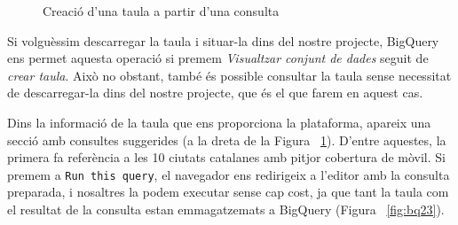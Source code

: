 \documentclass[12pt,longbibliography]{article}
\theoremstyle{definition}
\theoremstyle{remark}
\begin{document}
\vspace{2mm}
\begin{figure}[h!]
\par
{}%
\hfill
{}%
\par

\caption{Creació d'una taula a partir d'una consulta}
\label{fig:bq21}
\end{figure}
\vspace{2mm}

Si volguèssim descarregar la taula i situar-la dins del nostre projecte, BigQuery ens permet aquesta operació si premem \textit{Visualtzar conjunt de dades} seguit de \textit{crear taula}. Això no obstant, també és possible consultar la taula sense necessitat de descarregar-la dins del nostre projecte, que és el que farem en aquest cas.

\vspace{2mm}

Dins la informació de la taula que ens proporciona la plataforma, apareix una secció amb consultes suggerides (a la dreta de la Figura ~\ref{fig:bq21}). D'entre aquestes, la primera fa referència a les 10 ciutats catalanes amb pitjor cobertura de mòvil.  Si premem a \verb|Run this query|, el navegador ens redirigeix a l'editor amb la consulta preparada, i nosaltres la podem executar sense cap cost, ja que tant la taula com el resultat de la consulta estan emmagatzemats a BigQuery (Figura ~\ref{fig:bq23}).
\end{document}
